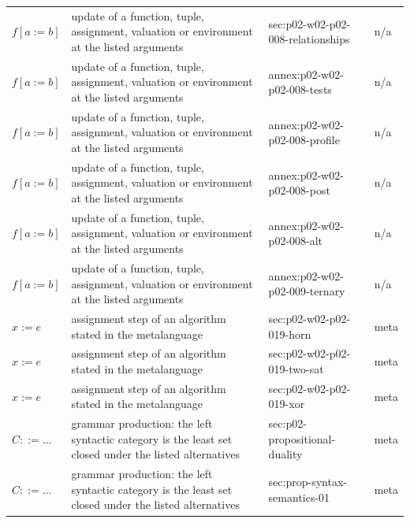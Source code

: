 \begin{longtable}{@{}p{}p{}p{}p{}@{}}
\(f[a:=b]\) & update of a function, tuple, assignment, valuation or environment at the listed arguments & sec:\allowbreak{}p02-\allowbreak{}w02-\allowbreak{}p02-\allowbreak{}008-\allowbreak{}relationships & n/a \\
\(f[a:=b]\) & update of a function, tuple, assignment, valuation or environment at the listed arguments & annex:\allowbreak{}p02-\allowbreak{}w02-\allowbreak{}p02-\allowbreak{}008-\allowbreak{}tests & n/a \\
\(f[a:=b]\) & update of a function, tuple, assignment, valuation or environment at the listed arguments & annex:\allowbreak{}p02-\allowbreak{}w02-\allowbreak{}p02-\allowbreak{}008-\allowbreak{}profile & n/a \\
\(f[a:=b]\) & update of a function, tuple, assignment, valuation or environment at the listed arguments & annex:\allowbreak{}p02-\allowbreak{}w02-\allowbreak{}p02-\allowbreak{}008-\allowbreak{}post & n/a \\
\(f[a:=b]\) & update of a function, tuple, assignment, valuation or environment at the listed arguments & annex:\allowbreak{}p02-\allowbreak{}w02-\allowbreak{}p02-\allowbreak{}008-\allowbreak{}alt & n/a \\
\(f[a:=b]\) & update of a function, tuple, assignment, valuation or environment at the listed arguments & annex:\allowbreak{}p02-\allowbreak{}w02-\allowbreak{}p02-\allowbreak{}009-\allowbreak{}ternary & n/a \\
\(x:=e\) & assignment step of an algorithm stated in the metalanguage & sec:\allowbreak{}p02-\allowbreak{}w02-\allowbreak{}p02-\allowbreak{}019-\allowbreak{}horn & meta \\
\(x:=e\) & assignment step of an algorithm stated in the metalanguage & sec:\allowbreak{}p02-\allowbreak{}w02-\allowbreak{}p02-\allowbreak{}019-\allowbreak{}two-\allowbreak{}sat & meta \\
\(x:=e\) & assignment step of an algorithm stated in the metalanguage & sec:\allowbreak{}p02-\allowbreak{}w02-\allowbreak{}p02-\allowbreak{}019-\allowbreak{}xor & meta \\
\(C::=\ldots\) & grammar production: the left syntactic category is the least set closed under the listed alternatives & sec:\allowbreak{}p02-\allowbreak{}propositional-\allowbreak{}duality & meta \\
\(C::=\ldots\) & grammar production: the left syntactic category is the least set closed under the listed alternatives & sec:\allowbreak{}prop-\allowbreak{}syntax-\allowbreak{}semantics-\allowbreak{}01 & meta \\

\end{longtable}
